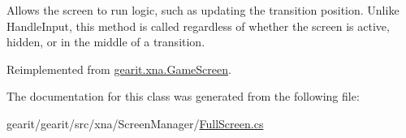 Allows the screen to run logic, such as updating the transition position. Unlike Handle\+Input, this method is called regardless of whether the screen is active, hidden, or in the middle of a transition. 



Reimplemented from \hyperlink{classgearit_1_1xna_1_1_game_screen_a6bb803502dfbd62b275c2a21d182f88e}{gearit.\+xna.\+Game\+Screen}.



The documentation for this class was generated from the following file\+:\begin{DoxyCompactItemize}
\item 
gearit/gearit/src/xna/\+Screen\+Manager/\hyperlink{_full_screen_8cs}{Full\+Screen.\+cs}\end{DoxyCompactItemize}
